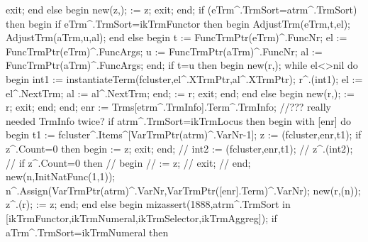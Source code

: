             exit;
         end
         else
         begin
            new(z,);
             := z;
            exit;
         end;
      if (eTrm^.TrmSort=atrm^.TrmSort) then
      begin
         if eTrm^.TrmSort=ikTrmFunctor then
         begin
            AdjustTrm(eTrm,t,el);
            AdjustTrm(aTrm,u,al);
         end
         else
         begin
            t := FuncTrmPtr(eTrm)^.FuncNr;
            el := FuncTrmPtr(eTrm)^.FuncArgs;
            u := FuncTrmPtr(aTrm)^.FuncNr;
            al := FuncTrmPtr(aTrm)^.FuncArgs;
         end;
         if t=u then
         begin
            new(r,);
            while el<>nil do
            begin
               int1 := instantiateTerm(fcluster,el^.XTrmPtr,al^.XTrmPtr);
               r^.(int1);
               el := el^.NextTrm;
               al := al^.NextTrm;
            end;
             := r;
            exit;
         end;
      end
      else
      begin
         new(r,);
          := r;
         exit;
      end;
   end;
   enr := Trms[etrm^.TrmInfo].Term^.TrmInfo; //??? really needed TrmInfo twice?
   if atrm^.TrmSort=ikTrmLocus then
   begin
      with [enr] do
      begin
         t1 := fcluster^.Items^[VarTrmPtr(atrm)^.VarNr-1];
         z := (fcluster,enr,t1);
         if z^.Count=0 then
         begin
             := z;
            exit;
         end;
         // int2 := (fcluster,enr,t1);
         // z^.(int2);
         // if z^.Count=0 then
         // begin
         //     := z;
         //    exit;
         // end;
         new(n,InitNatFunc(1,1));
         n^.Assign(VarTrmPtr(atrm)^.VarNr,VarTrmPtr([enr].Term)^.VarNr);
         new(r,(n));
         z^.(r);
          := z;
      end;
   end
   else
   begin
      mizassert(1888,atrm^.TrmSort in [ikTrmFunctor,ikTrmNumeral,ikTrmSelector,ikTrmAggreg]);
      if aTrm^.TrmSort=ikTrmNumeral then
